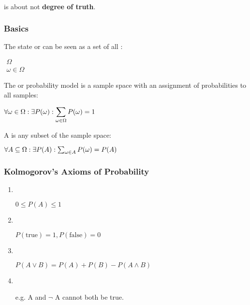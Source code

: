 \documentclass[
../../EiKI_Summary.tex,
]
{subfiles}
\begin{document}
 is about  not \textbf{degree of truth}.

\subsubsection{Basics}
The state or  can be seen as a set of all :

\begin{csmb*}
    $\substack{\displaystyle\Omega\\ \displaystyle{\omega \in \Omega}}$
\end{csmb*}

The  or probability model is a sample space with an assignment of probabilities to all samples:

\begin{csmb*}
    $\displaystyle \forall \omega \in \Omega: \space\space \exists P(\omega):\space\space
    \sum_{\omega \in \Omega} P(\omega) = 1$
\end{csmb*}

 A is any subset of the sample space:

\begin{csmb*}
    $\forall A \subseteq \Omega: \space\space \exists P(A): \space\space \sum_{\omega \in A} P(\omega) = P(A)$
\end{csmb*}

\newpage
\subsubsection{Kolmogorov's Axioms of Probability}
\begin{enumerate}
    \item {}\\
    \begin{smallmathbox*}
        $0 \leq P(A) \leq 1$
    \end{smallmathbox*}
    \item {}\\
    \begin{smallmathbox*}
        $P(\text{true}) = 1, P(\text{false}) = 0$
    \end{smallmathbox*}
    \item {}\\
    \begin{smallmathbox*}
        $P(A \lor B) = P(A) + P(B) - P(A \land B)$
    \end{smallmathbox*}
    \item {}\\
    \begin{smalldefbox*}
        e.g. A and $\neg$ A cannot both be true.
    \end{smalldefbox*}
\end{enumerate}
\end{document}
